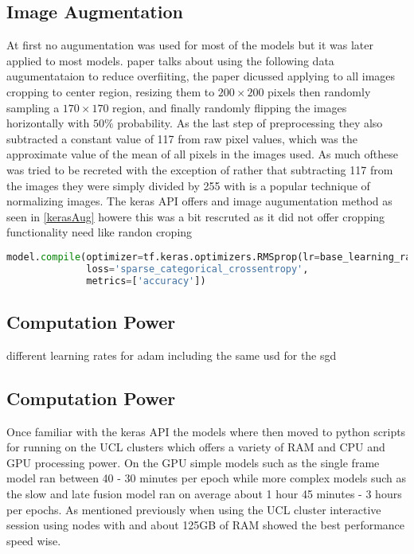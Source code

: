     
    \subsection{Image Augmentation}
     At first no augumentation was used for most of the models but it was later applied to most models. \citep{KarpathyCVPR14} paper talks about using the following data augumentataion to reduce overfiiting, the paper dicussed applying to all images cropping to center region, resizing them to $200 \times 200$ pixels then randomly sampling a $170 \times 170$ region, and finally randomly flipping the images horizontally with $50\%$ probability.  As the last step of preprocessing they also subtracted a constant value of 117 from raw pixel values, which was the approximate value of the mean of all pixels in  the images used. As much ofthese was tried to be recreted with the exception of rather that subtracting 117 from the images they were simply divided by 255 with is a popular technique of normalizing images. The keras API offers and image augumentation method as seen in \ref{kerasAug} howere this was a bit rescruted as it did not offer cropping functionality need like randon croping
     
         \begin{lstlisting}[language=Python, caption=keras image augumention, label=kerasAug]
    model.compile(optimizer=tf.keras.optimizers.RMSprop(lr=base_learning_rate),
              loss='sparse_categorical_crossentropy',
              metrics=['accuracy'])
      \end{lstlisting}          
    

     
     \subsection{Computation Power}
     different learning rates for adam including the same usd for the sgd
     
    \subsection{Computation Power}
    Once familiar with the keras API the models where then moved to python scripts for running on the UCL clusters which offers a variety of RAM and CPU and GPU processing power. On the GPU simple models such as the single frame model ran between 40 - 30 minutes per epoch while more complex models such as the slow and late fusion model ran on average about 1 hour 45 minutes - 3 hours per epochs. As mentioned previously when using the UCL cluster interactive session using nodes with  and about 125GB of RAM showed the best performance speed wise.
